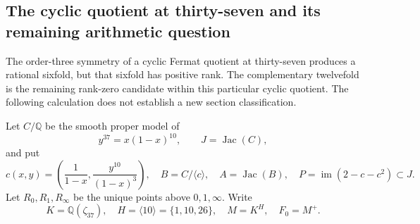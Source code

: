 \subsection{The cyclic quotient at thirty-seven and its remaining arithmetic question}
\label{subsec:thirtyseven-gate}

The order-three symmetry of a cyclic Fermat quotient at thirty-seven
produces a rational sixfold, but that sixfold has positive rank.
The complementary twelvefold is the remaining rank-zero candidate
within this particular cyclic quotient.  The following calculation
does not establish a new section classification.

Let $C/\mathbb Q$ be the smooth proper model of
\[
 y^{37}=x(1-x)^{10},\qquad J=\operatorname{Jac}(C),
\]
and put
\[
 c(x,y)=\left(\frac1{1-x},\frac{y^{10}}{(1-x)^3}\right),\quad
 B=C/\langle c\rangle,\quad A=\operatorname{Jac}(B),\quad
 P=\operatorname{im}(2-c-c^2)\subset J.
\]
Let $R_0,R_1,R_\infty$ be the unique points above $0,1,\infty$.
Write
\[
 K=\mathbb Q(\zeta_{37}),\quad H=\langle10\rangle=\{1,10,26\},
 \quad M=K^H,\quad F_0=M^+.
\]

